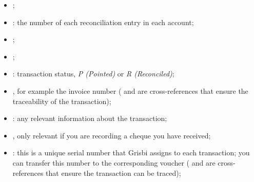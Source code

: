 \begin{itemize}
	\item {};
	\item {}: the number of each reconciliation entry in each account;
	\item {};
	\item {};
	\item {}: transaction status, \emph{P (Pointed)} or \emph{R (Reconciled)};
	\item {}, for example the invoice number ( and  are cross-references that ensure the traceability of the transaction);
	\item {}: any relevant information about the transaction;
	\item {}, only relevant if you are recording a cheque you have received;
	\item {}: this is a unique serial number that Grisbi assigns to each transaction; you can transfer this number to the corresponding voucher ( and  are cross-references that ensure the transaction can be traced);

\end{itemize}
